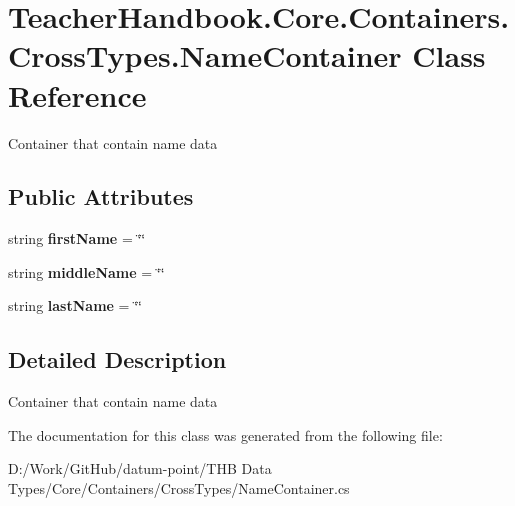 \hypertarget{class_teacher_handbook_1_1_core_1_1_containers_1_1_cross_types_1_1_name_container}{}\section{Teacher\+Handbook.\+Core.\+Containers.\+Cross\+Types.\+Name\+Container Class Reference}
\label{class_teacher_handbook_1_1_core_1_1_containers_1_1_cross_types_1_1_name_container}


Container that contain name data  


\subsection*{Public Attributes}
\begin{DoxyCompactItemize}
\item 
\mbox{\label{class_teacher_handbook_1_1_core_1_1_containers_1_1_cross_types_1_1_name_container_a25225029333995c9cf056b2a6a5eafb9}} 
string {\bfseries first\+Name} = \char`\"{}\char`\"{}
\item 
\mbox{\label{class_teacher_handbook_1_1_core_1_1_containers_1_1_cross_types_1_1_name_container_a11d62ef2b09dcf50ec4c9d1e6bb36f85}} 
string {\bfseries middle\+Name} = \char`\"{}\char`\"{}
\item 
\mbox{\label{class_teacher_handbook_1_1_core_1_1_containers_1_1_cross_types_1_1_name_container_a7427eea89f14e950f33efd2135607d4a}} 
string {\bfseries last\+Name} = \char`\"{}\char`\"{}
\end{DoxyCompactItemize}


\subsection{Detailed Description}
Container that contain name data 



The documentation for this class was generated from the following file\+:\begin{DoxyCompactItemize}
\item 
D\+:/\+Work/\+Git\+Hub/datum-\/point/\+T\+H\+B Data Types/\+Core/\+Containers/\+Cross\+Types/Name\+Container.\+cs\end{DoxyCompactItemize}
